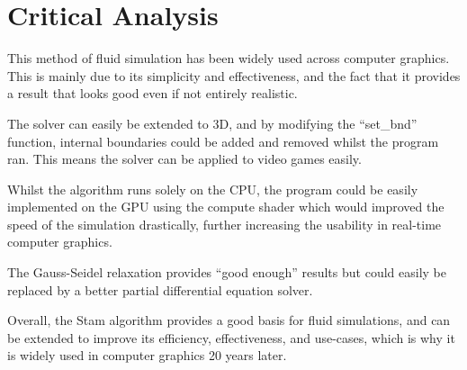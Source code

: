\documentclass[notitlepage,12pt]{article}
\begin{document}
\section{Critical Analysis}

This method of fluid simulation has been widely used across computer graphics. This is mainly due to its simplicity and effectiveness, and the fact that it provides a result that looks good even if not entirely realistic.

The solver can easily be extended to 3D, and by modifying the ``set\_bnd'' function, internal boundaries could be added and removed whilst the program ran. This means the solver can be applied to video games easily.

Whilst the algorithm runs solely on the CPU, the program could be easily implemented on the GPU using the compute shader which would improved the speed of the simulation drastically, further increasing the usability in real-time computer graphics.

The Gauss-Seidel relaxation provides ``good enough'' results but could easily be replaced by a better partial differential equation solver.

Overall, the Stam algorithm provides a good basis for fluid simulations, and can be extended to improve its efficiency, effectiveness, and use-cases, which is why it is widely used in computer graphics 20 years later.

\clearpage


\end{document}

